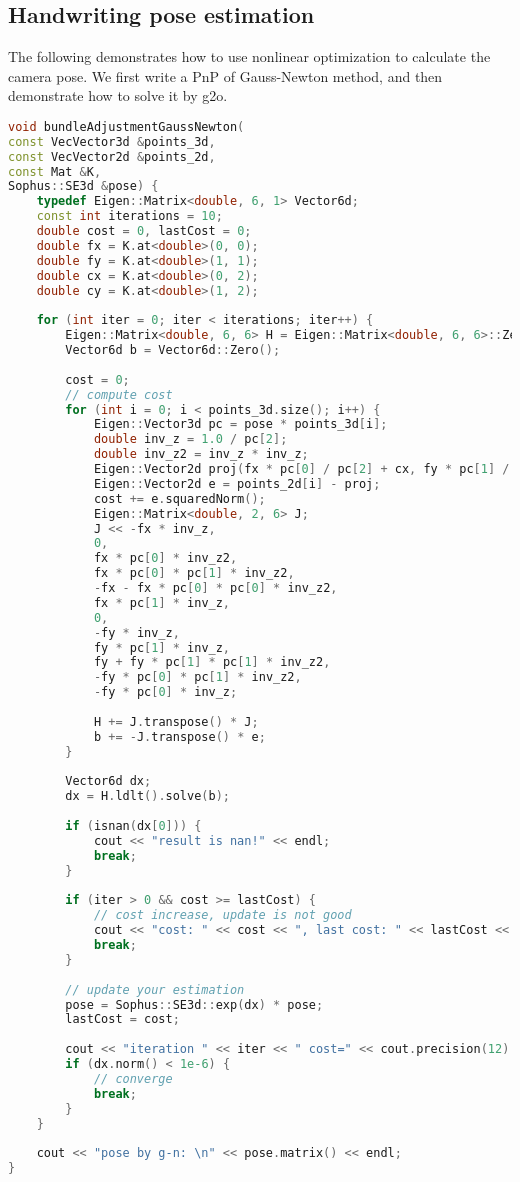 \subsection{Handwriting pose estimation}
The following demonstrates how to use nonlinear optimization to calculate the camera pose. We first write a PnP of Gauss-Newton method, and then demonstrate how to solve it by g2o.  
\begin{lstlisting}[language=c++,caption=slambook2/ch7/pose_estimation_3d2d.cpp（片段）]
void bundleAdjustmentGaussNewton(
const VecVector3d &points_3d,
const VecVector2d &points_2d,
const Mat &K,
Sophus::SE3d &pose) {
	typedef Eigen::Matrix<double, 6, 1> Vector6d;
	const int iterations = 10;
	double cost = 0, lastCost = 0;
	double fx = K.at<double>(0, 0);
	double fy = K.at<double>(1, 1);
	double cx = K.at<double>(0, 2);
	double cy = K.at<double>(1, 2);
	
	for (int iter = 0; iter < iterations; iter++) {
		Eigen::Matrix<double, 6, 6> H = Eigen::Matrix<double, 6, 6>::Zero();
		Vector6d b = Vector6d::Zero();
		
		cost = 0;
		// compute cost
		for (int i = 0; i < points_3d.size(); i++) {
			Eigen::Vector3d pc = pose * points_3d[i];
			double inv_z = 1.0 / pc[2];
			double inv_z2 = inv_z * inv_z;
			Eigen::Vector2d proj(fx * pc[0] / pc[2] + cx, fy * pc[1] / pc[2] + cy);
			Eigen::Vector2d e = points_2d[i] - proj;
			cost += e.squaredNorm();
			Eigen::Matrix<double, 2, 6> J;
			J << -fx * inv_z,
			0,
			fx * pc[0] * inv_z2,
			fx * pc[0] * pc[1] * inv_z2,
			-fx - fx * pc[0] * pc[0] * inv_z2,
			fx * pc[1] * inv_z,
			0,
			-fy * inv_z,
			fy * pc[1] * inv_z,
			fy + fy * pc[1] * pc[1] * inv_z2,
			-fy * pc[0] * pc[1] * inv_z2,
			-fy * pc[0] * inv_z;
			
			H += J.transpose() * J;
			b += -J.transpose() * e;
		}
		
		Vector6d dx;
		dx = H.ldlt().solve(b);
		
		if (isnan(dx[0])) {
			cout << "result is nan!" << endl;
			break;
		}
		
		if (iter > 0 && cost >= lastCost) {
			// cost increase, update is not good
			cout << "cost: " << cost << ", last cost: " << lastCost << endl;
			break;
		}
		
		// update your estimation
		pose = Sophus::SE3d::exp(dx) * pose;
		lastCost = cost;
		
		cout << "iteration " << iter << " cost=" << cout.precision(12) << cost << endl;
		if (dx.norm() < 1e-6) {
			// converge
			break;
		}
	}
	
	cout << "pose by g-n: \n" << pose.matrix() << endl;
}
\end{lstlisting}

